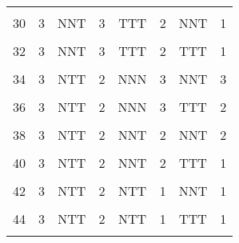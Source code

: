 \begin{table}[H]
{\begin{tabular}[t]{cccccccc}
			\cellcolor{gray!6}{29} & \cellcolor{gray!6}{3} & \cellcolor{gray!6}{NNT} & \cellcolor{gray!6}{3} & \cellcolor{gray!6}{TTT} & \cellcolor{gray!6}{2} & \cellcolor{gray!6}{NNN} & \cellcolor{gray!6}{2}\\
			30 & 3 & NNT & 3 & TTT & 2 & NNT & 1\\
			\cellcolor{gray!6}{31} & \cellcolor{gray!6}{3} & \cellcolor{gray!6}{NNT} & \cellcolor{gray!6}{3} & \cellcolor{gray!6}{TTT} & \cellcolor{gray!6}{2} & \cellcolor{gray!6}{NTT} & \cellcolor{gray!6}{1}\\
			32 & 3 & NNT & 3 & TTT & 2 & TTT & 1\\
			\cellcolor{gray!6}{33} & \cellcolor{gray!6}{3} & \cellcolor{gray!6}{NTT} & \cellcolor{gray!6}{2} & \cellcolor{gray!6}{NNN} & \cellcolor{gray!6}{3} & \cellcolor{gray!6}{NNN} & \cellcolor{gray!6}{3}\\
			34 & 3 & NTT & 2 & NNN & 3 & NNT & 3\\
			\cellcolor{gray!6}{35} & \cellcolor{gray!6}{3} & \cellcolor{gray!6}{NTT} & \cellcolor{gray!6}{2} & \cellcolor{gray!6}{NNN} & \cellcolor{gray!6}{3} & \cellcolor{gray!6}{NTT} & \cellcolor{gray!6}{2}\\
			36 & 3 & NTT & 2 & NNN & 3 & TTT & 2\\
			\cellcolor{gray!6}{37} & \cellcolor{gray!6}{3} & \cellcolor{gray!6}{NTT} & \cellcolor{gray!6}{2} & \cellcolor{gray!6}{NNT} & \cellcolor{gray!6}{2} & \cellcolor{gray!6}{NNN} & \cellcolor{gray!6}{2}\\
			38 & 3 & NTT & 2 & NNT & 2 & NNT & 2\\
			\cellcolor{gray!6}{39} & \cellcolor{gray!6}{3} & \cellcolor{gray!6}{NTT} & \cellcolor{gray!6}{2} & \cellcolor{gray!6}{NNT} & \cellcolor{gray!6}{2} & \cellcolor{gray!6}{NTT} & \cellcolor{gray!6}{1}\\
			40 & 3 & NTT & 2 & NNT & 2 & TTT & 1\\
			\cellcolor{gray!6}{41} & \cellcolor{gray!6}{3} & \cellcolor{gray!6}{NTT} & \cellcolor{gray!6}{2} & \cellcolor{gray!6}{NTT} & \cellcolor{gray!6}{1} & \cellcolor{gray!6}{NNN} & \cellcolor{gray!6}{2}\\
			42 & 3 & NTT & 2 & NTT & 1 & NNT & 1\\
			\cellcolor{gray!6}{43} & \cellcolor{gray!6}{3} & \cellcolor{gray!6}{NTT} & \cellcolor{gray!6}{2} & \cellcolor{gray!6}{NTT} & \cellcolor{gray!6}{1} & \cellcolor{gray!6}{NTT} & \cellcolor{gray!6}{1}\\
			44 & 3 & NTT & 2 & NTT & 1 & TTT & 1\\
			\cellcolor{gray!6}{45} & \cellcolor{gray!6}{3} & \cellcolor{gray!6}{NTT} & \cellcolor{gray!6}{2} & \cellcolor{gray!6}{TTT} & \cellcolor{gray!6}{1} & \cellcolor{gray!6}{NNN} & \cellcolor{gray!6}{1}\\

\end{tabular}}
\end{table}
